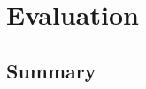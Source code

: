 %

\acresetall

\chapter{Evaluation}
\label{ch:Evaluation}






%



\section{Summary}
\label{sec:SummaryEvaluation}


